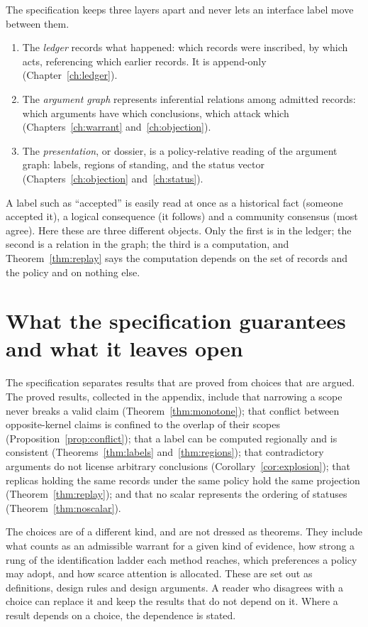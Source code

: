 The specification keeps three layers apart and never lets an interface label move between them.
\begin{enumerate}
\item The \emph{ledger} records what happened: which records were inscribed, by which acts, referencing which earlier records. It is append-only (Chapter~\ref{ch:ledger}).
\item The \emph{argument graph} represents inferential relations among admitted records: which arguments have which conclusions, which attack which (Chapters~\ref{ch:warrant} and~\ref{ch:objection}).
\item The \emph{presentation}, or dossier, is a policy-relative reading of the argument graph: labels, regions of standing, and the status vector (Chapters~\ref{ch:objection} and~\ref{ch:status}).
\end{enumerate}
A label such as ``accepted'' is easily read at once as a historical fact (someone accepted it), a logical consequence (it follows) and a community consensus (most agree). Here these are three different objects. Only the first is in the ledger; the second is a relation in the graph; the third is a computation, and Theorem~\ref{thm:replay} says the computation depends on the set of records and the policy and on nothing else.

\section{What the specification guarantees and what it leaves open}\label{sec:guarantees}

The specification separates results that are proved from choices that are argued. The proved results, collected in the appendix, include that narrowing a scope never breaks a valid claim (Theorem~\ref{thm:monotone}); that conflict between opposite-kernel claims is confined to the overlap of their scopes (Proposition~\ref{prop:conflict}); that a label can be computed regionally and is consistent (Theorems~\ref{thm:labels} and~\ref{thm:regions}); that contradictory arguments do not license arbitrary conclusions (Corollary~\ref{cor:explosion}); that replicas holding the same records under the same policy hold the same projection (Theorem~\ref{thm:replay}); and that no scalar represents the ordering of statuses (Theorem~\ref{thm:noscalar}).

The choices are of a different kind, and are not dressed as theorems. They include what counts as an admissible warrant for a given kind of evidence, how strong a rung of the identification ladder each method reaches, which preferences a policy may adopt, and how scarce attention is allocated. These are set out as definitions, design rules and design arguments. A reader who disagrees with a choice can replace it and keep the results that do not depend on it. Where a result depends on a choice, the dependence is stated.

